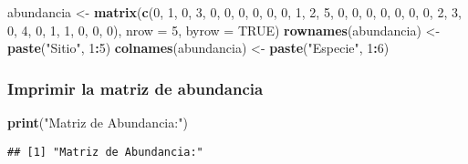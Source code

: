 \documentclass[
]{article}
\newenvironment{Shaded}{\begin{snugshade}}{\end{snugshade}}
\newcommand{\AttributeTok}[1]{\textcolor[rgb]{0.13,0.29,0.53}{#1}}
\newcommand{\ConstantTok}[1]{\textcolor[rgb]{0.56,0.35,0.01}{#1}}
\newcommand{\DecValTok}[1]{\textcolor[rgb]{0.00,0.00,0.81}{#1}}
\newcommand{\FunctionTok}[1]{\textcolor[rgb]{0.13,0.29,0.53}{\textbf{#1}}}
\newcommand{\NormalTok}[1]{#1}
\newcommand{\OtherTok}[1]{\textcolor[rgb]{0.56,0.35,0.01}{#1}}
\newcommand{\SpecialCharTok}[1]{\textcolor[rgb]{0.81,0.36,0.00}{\textbf{#1}}}
\newcommand{\StringTok}[1]{\textcolor[rgb]{0.31,0.60,0.02}{#1}}
\begin{document}
\begin{Shaded}
\begin{Highlighting}[]
\NormalTok{abundancia }\OtherTok{\textless{}{-}} \FunctionTok{matrix}\NormalTok{(}\FunctionTok{c}\NormalTok{(}\DecValTok{0}\NormalTok{, }\DecValTok{1}\NormalTok{, }\DecValTok{0}\NormalTok{, }\DecValTok{3}\NormalTok{, }\DecValTok{0}\NormalTok{, }\DecValTok{0}\NormalTok{,}
                       \DecValTok{0}\NormalTok{, }\DecValTok{0}\NormalTok{, }\DecValTok{0}\NormalTok{, }\DecValTok{0}\NormalTok{, }\DecValTok{1}\NormalTok{, }\DecValTok{2}\NormalTok{,}
                       \DecValTok{5}\NormalTok{, }\DecValTok{0}\NormalTok{, }\DecValTok{0}\NormalTok{, }\DecValTok{0}\NormalTok{, }\DecValTok{0}\NormalTok{, }\DecValTok{0}\NormalTok{,}
                       \DecValTok{0}\NormalTok{, }\DecValTok{0}\NormalTok{, }\DecValTok{2}\NormalTok{, }\DecValTok{3}\NormalTok{, }\DecValTok{0}\NormalTok{, }\DecValTok{4}\NormalTok{,}
                       \DecValTok{0}\NormalTok{, }\DecValTok{1}\NormalTok{, }\DecValTok{1}\NormalTok{, }\DecValTok{0}\NormalTok{, }\DecValTok{0}\NormalTok{, }\DecValTok{0}\NormalTok{), }
                     \AttributeTok{nrow =} \DecValTok{5}\NormalTok{, }\AttributeTok{byrow =} \ConstantTok{TRUE}\NormalTok{)}
\FunctionTok{rownames}\NormalTok{(abundancia) }\OtherTok{\textless{}{-}} \FunctionTok{paste}\NormalTok{(}\StringTok{"Sitio"}\NormalTok{, }\DecValTok{1}\SpecialCharTok{:}\DecValTok{5}\NormalTok{)}
\FunctionTok{colnames}\NormalTok{(abundancia) }\OtherTok{\textless{}{-}} \FunctionTok{paste}\NormalTok{(}\StringTok{"Especie"}\NormalTok{, }\DecValTok{1}\SpecialCharTok{:}\DecValTok{6}\NormalTok{)}
\end{Highlighting}
\end{Shaded}

\hypertarget{imprimir-la-matriz-de-abundancia}{%
\subsubsection{Imprimir la matriz de
abundancia}\label{imprimir-la-matriz-de-abundancia}}

\begin{Shaded}
\begin{Highlighting}[]
\FunctionTok{print}\NormalTok{(}\StringTok{"Matriz de Abundancia:"}\NormalTok{)}
\end{Highlighting}
\end{Shaded}

\begin{verbatim}
## [1] "Matriz de Abundancia:"
\end{verbatim}
\end{document}
